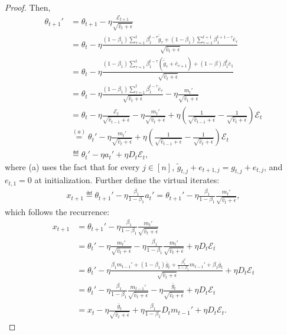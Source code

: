 \documentclass[11pt]{article}
\begin{document}
\begin{proof}
Then, 
\begin{align*}
    \theta_{t+1}'&=\theta_{t+1}-\eta \frac{\mathcal E_{t+1}}{\sqrt{\hat v_t+\epsilon}}\\
    &=\theta_t-\eta\frac{(1-\beta_1)\sum_{\tau=1}^{t} \beta_1^{t-\tau}\overline{\tilde g}_\tau+(1-\beta_1)\sum_{\tau=1}^{t+1} \beta_1^{t+1-\tau}\bar e_\tau}{\sqrt{\hat v_t+\epsilon}}\\
    &=\theta_t-\eta\frac{(1-\beta_1)\sum_{\tau=1}^{t} \beta_1^{t-\tau}(\overline{\tilde g}_\tau+ \bar e_{\tau+1})+(1-\beta)\beta_1^t \bar e_1}{\sqrt{\hat v_t+\epsilon}}\\
    &=\theta_t-\eta\frac{(1-\beta_1)\sum_{\tau=1}^{t} \beta_1^{t-\tau} \bar e_\tau}{\sqrt{\hat v_t+\epsilon}}-\eta\frac{m_t'}{\sqrt{\hat v_t+\epsilon}}\\
    &=\theta_t-\eta\frac{\mathcal E_t}{\sqrt{\hat v_{t-1}+\epsilon}}-\eta\frac{m_t'}{\sqrt{\hat v_t+\epsilon}}+\eta(\frac{1}{\sqrt{\hat v_{t-1}+\epsilon}}-\frac{1}{\sqrt{\hat v_t+\epsilon}})\mathcal E_t\\
    &\overset{(a)}{=}\theta_t'-\eta\frac{m_t'}{\sqrt{\hat v_t+\epsilon}}+\eta(\frac{1}{\sqrt{\hat v_{t-1}+\epsilon}}-\frac{1}{\sqrt{\hat v_t+\epsilon}})\mathcal E_t\\
    &\eqdef \theta_t'-\eta a_t'+\eta D_t\mathcal E_t,
\end{align*}
where (a) uses the fact that for every $j\in[n]$, $\tilde g_{t,j}+e_{{t+1,j}}=g_{t,j}+e_{t,j}$, and $e_{t,1}=0$ at initialization. Further define the virtual iterates:
\begin{align*}
    x_{t+1}\eqdef \theta_{t+1}'-\eta \frac{\beta_1}{1-\beta_1}a_t'=\theta_{t+1}'-\eta \frac{\beta_1}{1-\beta_1} \frac{m_t'}{\sqrt{\hat v_t+\epsilon}},
\end{align*}
which follows the recurrence:
\begin{align*}
    x_{t+1}&=\theta_{t+1}'-\eta\frac{\beta_1}{1-\beta_1} \frac{m_t'}{\sqrt{\hat v_t+\epsilon}}\\
    &=\theta_t'-\eta\frac{m_t'}{\sqrt{\hat v_t+\epsilon}}-\eta\frac{\beta_1}{1-\beta_1} \frac{m_t'}{\sqrt{\hat v_t+\epsilon}}+\eta D_t\mathcal E_t\\
    &=\theta_t'-\eta \frac{\beta_1 m_{t-1}'+(1-\beta_1)\bar g_t+\frac{\beta_1^2}{1-\beta_1}m_{t-1}'+\beta_1 \bar g_t}{\sqrt{\hat v_t+\epsilon}}+\eta D_t\mathcal E_t\\
    &=\theta_t'-\eta\frac{\beta_1}{1-\beta_1}\frac{m_{t-1}'}{\sqrt{\hat v_t+\epsilon}}-\eta\frac{\bar g_t}{\sqrt{\hat v_t+\epsilon}}+\eta D_t\mathcal E_t\\
    &=x_t-\eta\frac{\bar g_t}{\sqrt{\hat v_t+\epsilon}}+\eta\frac{\beta_1}{1-\beta_1} D_t m_{t-1}'+\eta D_t\mathcal E_t.
\end{align*}


\end{proof}
\end{document}
